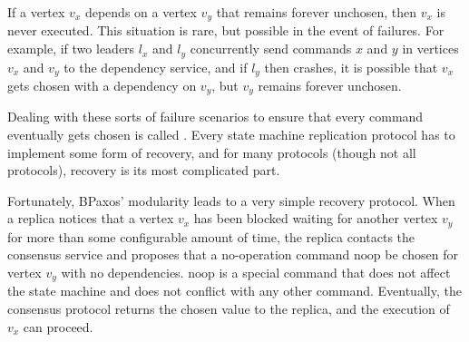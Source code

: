 If a vertex $v_x$ depends on a vertex $v_y$ that remains forever unchosen, then
$v_x$ is never executed. This situation is rare, but possible in the event of
failures. For example, if two leaders $l_x$ and $l_y$ concurrently send
commands $x$ and $y$ in vertices $v_x$ and $v_y$ to the dependency service, and
if $l_y$ then crashes, it is possible that $v_x$ gets chosen with a dependency
on $v_y$, but $v_y$ remains forever unchosen.

Dealing with these sorts of failure scenarios to ensure that every command
eventually gets chosen is called . Every state machine
replication protocol has to implement some form of recovery, and for many
protocols (though not all protocols), recovery is its most complicated part.

\newcommand{\noop}{\text{noop}}
Fortunately, BPaxos' modularity leads to a very simple recovery protocol. When
a replica notices that a vertex $v_x$ has been blocked waiting for another
vertex $v_y$ for more than some configurable amount of time, the replica
contacts the consensus service and proposes that a no-operation command $\noop$
be chosen for vertex $v_y$ with no dependencies. $\noop$ is a special command
that does not affect the state machine and does not conflict with any other
command. Eventually, the consensus protocol returns the chosen value to the
replica, and the execution of $v_x$ can proceed.

